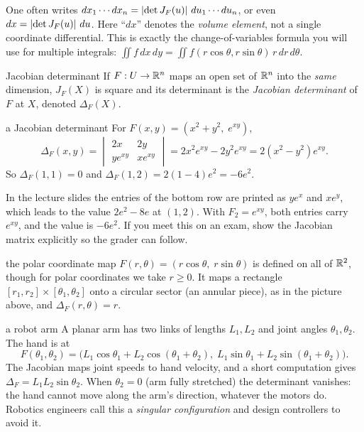 \begin{extra}
One often writes $dx_1\cdots dx_n=\left\lvert \det J_F(u)\right\rvert\,du_1\cdots du_n$, or even $dx=\left\lvert \det J_F(u)\right\rvert\,du$.
Here ``$dx$'' denotes the \emph{volume element}, not a single coordinate differential. This is
exactly the change-of-variables formula you will use for multiple integrals:
$\iint f\,dx\,dy=\iint f(r\cos\theta,r\sin\theta)\,r\,dr\,d\theta$.
\end{extra}

\begin{definition}{Jacobian determinant}
If $F:U\to\mathbb{R}^n$ maps an open set of $\mathbb{R}^n$ into the \emph{same} dimension, $J_F(X)$ is square and
its determinant is the \emph{Jacobian determinant} of $F$ at $X$, denoted $\Delta_F(X)$.
\end{definition}

\begin{example}{a Jacobian determinant}
For $F(x,y)=(x^2+y^2,\;e^{xy})$,
\[
\Delta_F(x,y)=\begin{vmatrix}2x&2y\\ ye^{xy}&xe^{xy}\end{vmatrix}=2x^2e^{xy}-2y^2e^{xy}=2(x^2-y^2)e^{xy}.
\]
So $\Delta_F(1,1)=0$ and $\Delta_F(1,2)=2(1-4)e^2=-6e^2$.
\end{example}

\begin{trap}
In the lecture slides the entries of the bottom row are printed as $ye^x$ and $xe^y$, which leads
to the value $2e^2-8e$ at $(1,2)$. With $F_2=e^{xy}$, both entries carry $e^{xy}$, and the value is
$-6e^2$. If you meet this on an exam, show the Jacobian matrix explicitly so the grader can follow.
\end{trap}

\begin{example}{the polar coordinate map}
$F(r,\theta)=(r\cos\theta,\;r\sin\theta)$ is defined on all of $\mathbb{R}^2$, though for polar coordinates
we take $r\ge0$. It maps a rectangle $[r_1,r_2]\times[\theta_1,\theta_2]$ onto a circular sector (an
annular piece), as in the picture above, and $\Delta_F(r,\theta)=r$.
\end{example}

\begin{reallife}{a robot arm}
A planar arm has two links of lengths $L_1,L_2$ and joint angles $\theta_1,\theta_2$. The hand is at
\[ F(\theta_1,\theta_2)=\big(L_1\cos\theta_1+L_2\cos(\theta_1+\theta_2),\;L_1\sin\theta_1+L_2\sin(\theta_1+\theta_2)\big). \]
The Jacobian maps joint speeds to hand velocity, and a short computation gives
$\Delta_F=L_1L_2\sin\theta_2$. When $\theta_2=0$ (arm fully stretched) the determinant vanishes: the hand
cannot move along the arm's direction, whatever the motors do. Robotics engineers call this a
\emph{singular configuration} and design controllers to avoid it.
\end{reallife}

